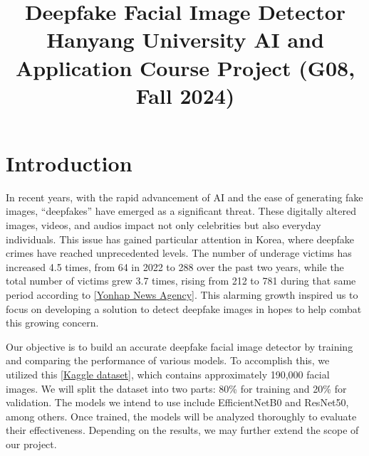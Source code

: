 \documentclass[conference]{IEEEtran}
\begin{document}
\title{Deepfake Facial Image Detector\\
{\large Hanyang University AI and Application Course Project (G08, Fall 2024)}}

\author{
\and
{}
\and
{}
\and
{}
}


\maketitle

\section*{Introduction}
In recent years, with the rapid advancement of AI and the ease of generating fake images, “deepfakes” have emerged as a significant threat. These digitally altered images, videos, and audios impact not only celebrities but also everyday individuals. This issue has gained particular attention in Korea, where deepfake crimes have reached unprecedented levels. The number of underage victims has increased 4.5 times, from 64 in 2022 to 288 over the past two years, while the total number of victims grew 3.7 times, rising from 212 to 781 during that same period according to \href{https://en.yna.co.kr/view/AEN20240828003100315}{[Yonhap News Agency]}. This alarming growth inspired us to focus on developing a solution to detect deepfake images in hopes to help combat this growing concern.

Our objective is to build an accurate deepfake facial image detector by training and comparing the performance of various models. To accomplish this, we utilized this \href{https://www.kaggle.com/datasets/manjilkarki/deepfake-and-real-images}{[Kaggle dataset]}, which contains approximately 190,000 facial images. We will split the dataset into two parts: 80\% for training and 20\% for validation. The models we intend to use include EfficientNetB0 and ResNet50, among others. Once trained, the models will be analyzed thoroughly to evaluate their effectiveness. Depending on the results, we may further extend the scope of our project.
\end{document}
